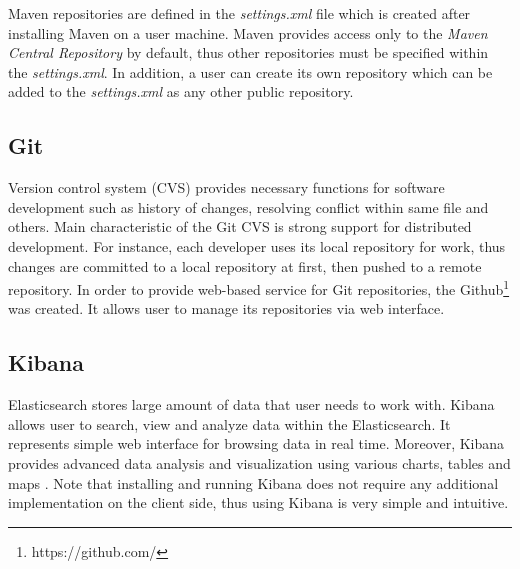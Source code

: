\documentclass[12pt,oneside]{fithesis2}
\begin{document}
Maven repositories are defined in the \textit{settings.xml} file which is created after installing Maven on a user machine. Maven provides access only to the \textit{Maven Central Repository} by default, thus other repositories must be specified within the \textit{settings.xml}. In addition, a user can create its own repository which can be added to the \textit{settings.xml} as any other public repository.

\subsection{Git}
Version control system (CVS) provides necessary functions for software development such as history of changes, resolving conflict within same file and others. Main characteristic of the Git CVS is strong support for distributed development. For instance, each developer uses its local repository for work, thus changes are committed to a local repository at first, then pushed to a remote repository. In order to provide web-based service for Git repositories, the Github\footnote{https://github.com/} was created. It allows user to manage its repositories via web interface.

\subsection{Kibana}
Elasticsearch stores large amount of data that user needs to work with. Kibana allows user to search, view and analyze data within the Elasticsearch. It represents simple web interface for browsing data in real time. Moreover, Kibana provides advanced data analysis and visualization using various charts, tables and maps \cite[Introduction]{kibana_doc}. Note that installing and running Kibana does not require any additional implementation on the client side, thus using Kibana is very simple and intuitive.
\end{document}
